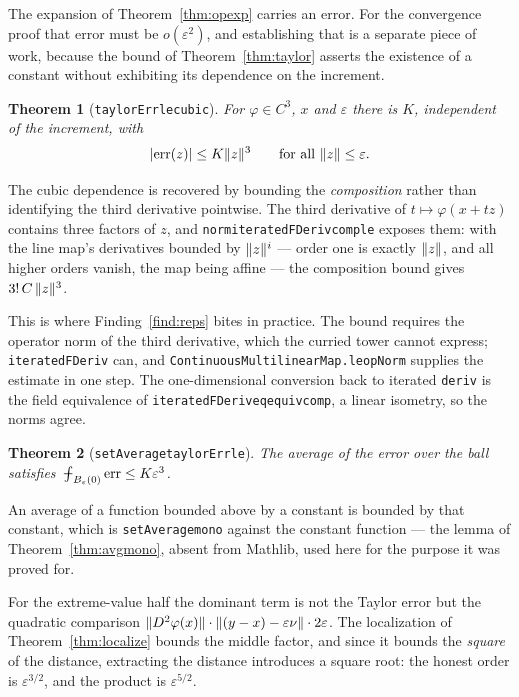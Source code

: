 \documentclass[11pt,reqno]{amsart}
\newcommand{\fint}{\mathop{\mathrlap{\,\rule[0.62ex]{0.62em}{0.5pt}}\int}}
\newcommand{\LEANREF}[1]{\texttt{\small\def\_{\textunderscore\allowbreak}#1}}
\newcommand{\eps}{\varepsilon}
\newcommand{\avgint}{\fint}
\DeclarePairedDelimiter{\abs}{\lvert}{\rvert}
\DeclarePairedDelimiter{\norm}{\lVert}{\rVert}
\theoremstyle{plain}
\newtheorem{theorem}{Theorem}[section]
\theoremstyle{definition}
\begin{document}
The expansion of Theorem~\ref{thm:opexp} carries an error. For the
convergence proof that error must be $o(\eps^2)$, and establishing that is a
separate piece of work, because the bound of Theorem~\ref{thm:taylor} asserts
the existence of a constant without exhibiting its dependence on the
increment.

\begin{theorem}[\LEANREF{taylorErr\_le\_cubic}]\label{thm:cubicrate}
For $\varphi \in C^3$, $x$ and $\eps$ there is $K$, independent of the
increment, with
\[
  \abs{\mathrm{err}(z)} \le K \norm{z}^3
  \qquad\text{for all } \norm{z} \le \eps .
\]
\end{theorem}

The cubic dependence is recovered by bounding the \emph{composition} rather
than identifying the third derivative pointwise. The third derivative of
$t \mapsto \varphi(x+tz)$ contains three factors of $z$, and
\LEANREF{norm\_iteratedFDeriv\_comp\_le} exposes them: with the line map's
derivatives bounded by $\norm{z}^i$ --- order one is exactly $\norm{z}$, and
all higher orders vanish, the map being affine --- the composition bound gives
$3!\,C\,\norm{z}^3$.

This is where Finding~\ref{find:reps} bites in practice. The bound requires
the operator norm of the third derivative, which the curried tower cannot
express; \LEANREF{iteratedFDeriv} can, and
\LEANREF{ContinuousMultilinearMap.le\_opNorm} supplies the estimate in one
step. The one-dimensional conversion back to iterated \LEANREF{deriv} is the
field equivalence of \LEANREF{iteratedFDeriv\_eq\_equiv\_comp}, a linear
isometry, so the norms agree.

\begin{theorem}[\LEANREF{setAverage\_taylorErr\_le}]\label{thm:avgrate}
The average of the error over the ball satisfies
$\avgint_{B_\eps(0)} \mathrm{err} \le K\eps^3$.
\end{theorem}

An average of a function bounded above by a constant is bounded by that
constant, which is \LEANREF{setAverage\_mono} against the constant function
--- the lemma of Theorem~\ref{thm:avgmono}, absent from Mathlib, used here for
the purpose it was proved for.

For the extreme-value half the dominant term is not the Taylor error but the
quadratic comparison $\norm{D^2\varphi(x)} \cdot
\norm{(y-x)-\eps\nu} \cdot 2\eps$. The localization of
Theorem~\ref{thm:localize} bounds the middle factor, and since it bounds the
\emph{square} of the distance, extracting the distance introduces a square
root: the honest order is $\eps^{3/2}$, and the product is $\eps^{5/2}$.
\end{document}
